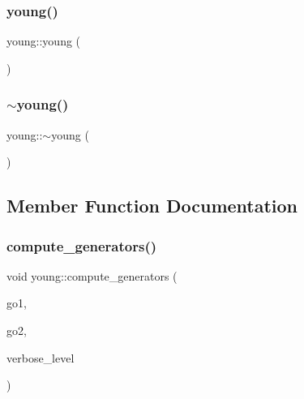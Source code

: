 \subsubsection{\texorpdfstring{young()}{young()}}
{\footnotesize\ttfamily young\+::young (\begin{DoxyParamCaption}{ }\end{DoxyParamCaption})}

\mbox{\label{classyoung_ac8719499d429636a48c3728ddc1a26b0}} 
\subsubsection{\texorpdfstring{$\sim$young()}{~young()}}
{\footnotesize\ttfamily young\+::$\sim$young (\begin{DoxyParamCaption}{ }\end{DoxyParamCaption})}



\subsection{Member Function Documentation}
\mbox{\label{classyoung_a26c8929e3f3f49437e3241f5d627ee20}} 
\subsubsection{\texorpdfstring{compute\+\_\+generators()}{compute\_generators()}}
{\footnotesize\ttfamily void young\+::compute\+\_\+generators (\begin{DoxyParamCaption}\item[{\mbox{\hyperlink{galois_8h_a09fddde158a3a20bd2dcadb609de11dc}{I\+NT}} \&}]{go1,  }\item[{\mbox{\hyperlink{galois_8h_a09fddde158a3a20bd2dcadb609de11dc}{I\+NT}} \&}]{go2,  }\item[{\mbox{\hyperlink{galois_8h_a09fddde158a3a20bd2dcadb609de11dc}{I\+NT}}}]{verbose\+\_\+level }\end{DoxyParamCaption})}

\mbox{\label{classyoung_a552fe75292286e49ee0d3f282ea03f8e}} 
